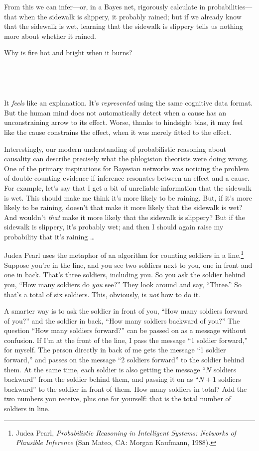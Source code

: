 {
 From this we can infer---or, in a Bayes net, rigorously calculate
in probabilities---that when the sidewalk is slippery, it probably
rained; but if we already know that the sidewalk is wet, learning that
the sidewalk is slippery tells us nothing more about whether it
rained.}

{
 Why is fire hot and bright when it burns?}

{
 ~}


{
 ~}

{
 It \textit{feels} like an explanation. It's
\textit{represented} using the same cognitive data format. But the
human mind does not automatically detect when a cause has an
unconstraining arrow to its effect. Worse, thanks to hindsight bias, it
may feel like the cause constrains the effect, when it was merely
fitted to the effect.}

{
 Interestingly, our modern understanding of probabilistic reasoning
about causality can describe precisely what the phlogiston theorists
were doing wrong. One of the primary inspirations for Bayesian networks
was noticing the problem of double-counting evidence if inference
resonates between an effect and a cause. For example,
let's say that I get a bit of unreliable information
that the sidewalk is wet. This should make me think
it's more likely to be raining. But, if
it's more likely to be raining, doesn't
that make it more likely that the sidewalk is wet? And
wouldn't \textit{that} make it more likely that the
sidewalk is slippery? But if the sidewalk is slippery,
it's probably wet; and then I should again raise my
probability that it's raining \ldots}

{
 Judea Pearl uses the metaphor of an algorithm for counting
soldiers in a line.\footnote{Judea Pearl, \textit{Probabilistic Reasoning in Intelligent
Systems: Networks of Plausible Inference} (San Mateo, CA: Morgan
Kaufmann, 1988).} Suppose you're
in the line, and you see two soldiers next to you, one in front and one
in back. That's three soldiers, including you. So you
ask the soldier behind you, ``How many soldiers do
\textit{you} see?'' They look around and say,
``Three.'' So that's
a total of six soldiers. This, obviously, is \textit{not} how to do
it.}

{
 A smarter way is to ask the soldier in front of you,
``How many soldiers forward of
you?'' and the soldier in back,
``How many soldiers backward of
you?'' The question ``How many
soldiers forward?'' can be passed on as a message
without confusion. If I'm at the front of the line, I
pass the message ``1 soldier
forward,'' for myself. The person directly in back of
me gets the message ``1 soldier
forward,'' and passes on the message
``2 soldiers forward'' to the
soldier behind them. At the same time, each soldier is also getting the
message ``$N$ soldiers backward'' from
the soldier behind them, and passing it on as ``$N + 1$
soldiers backward'' to the soldier in front of them.
How many soldiers in total? Add the two numbers you receive, plus one
for yourself: that is the total number of soldiers in line.}

